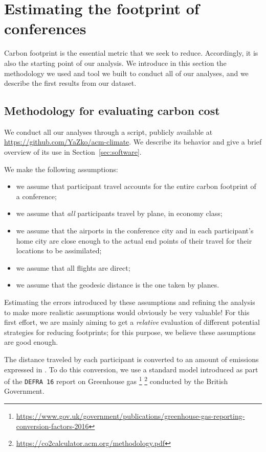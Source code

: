 \section{Estimating the footprint of conferences}
\label{sec:footprint}

Carbon footprint is the essential metric that we seek to reduce.
Accordingly, it is also the starting point of our analysis.  We introduce in
this section the methodology we used and tool we built to conduct all of our
analyses, and we describe the first results from our dataset.

\subsection{Methodology for evaluating carbon cost}
\label{sec:methodo}

We conduct all our analyses through a \python{} script, publicly available at
\url{https://github.com/YaZko/acm-climate}. We describe its behavior and give
a brief overview of its use in Section~\ref{sec:software}.

We make the following assumptions:
\begin{itemize}
\item we assume that participant travel accounts for the entire carbon
footprint of a conference;
\item we assume that \emph{all} participants travel by plane, in economy
class; 
\item we assume that the airports in the conference city and in each
participant's home city are close enough to the actual end points of their
travel for their locations to be assimilated;
\item we assume that all flights are direct;
\item we assume that the geodesic distance is the one taken by planes.
\end{itemize}
Estimating the errors introduced by these assumptions and refining the
analysis to make more realistic assumptions would obviously be very
valuable! 
%
For this first effort, we are mainly aiming to get a 
{\em relative} evaluation of different potential strategies for reducing
footprints; for this purpose, we believe these assumptions are good enough. 

The distance traveled by each participant is converted to an amount of
emissions expressed in \gaz. To do this conversion, we use a standard model
introduced as part of the \texttt{DEFRA 16} report on Greenhouse gas
\footnote{\url{https://www.gov.uk/government/publications/greenhouse-gas-reporting-conversion-factors-2016}}
\footnote{\url{https://co2calculator.acm.org/methodology.pdf}} conducted by
the British Government.

